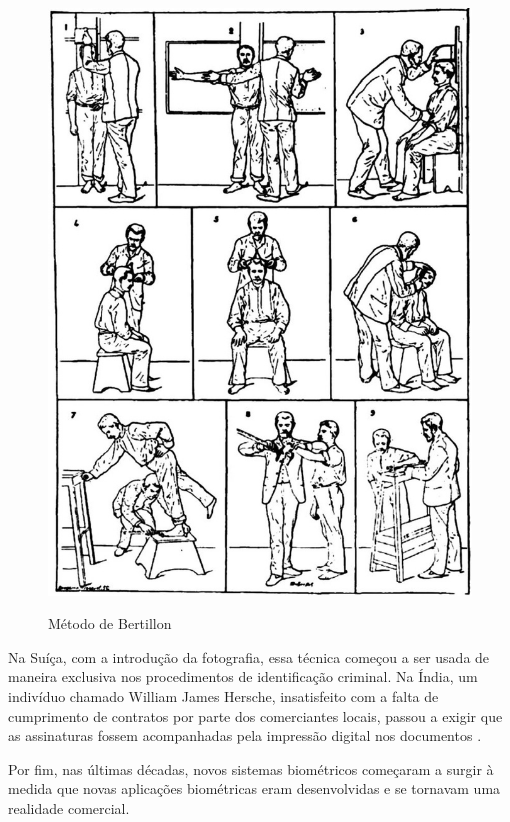 \begin{figure}[h!]
    \centering
    \caption{Método de Bertillon}
    \includegraphics[scale=0.25]{figuras/bertillon.jpg} 
    \label{fig:bertillon}
    \centering
\end{figure}

Na Suíça, com a introdução da fotografia, essa técnica começou a ser 
usada de maneira exclusiva nos procedimentos de identificação 
criminal. Na Índia, um indivíduo chamado William James Hersche, 
insatisfeito com a falta de cumprimento de contratos por parte 
dos comerciantes locais, passou a exigir que as assinaturas 
fossem acompanhadas pela impressão digital nos documentos \cite{boechat2008}.

Por fim, nas últimas décadas, novos sistemas biométricos começaram a surgir 
à medida que novas aplicações biométricas eram desenvolvidas e se tornavam 
uma realidade comercial.

